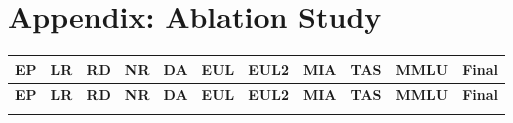 \documentclass[11pt]{article}
\begin{document}
%



\appendix
\onecolumn
\section{Appendix: Ablation Study}\nopagebreak[4]
\nopagebreak
\label{sec:appendixA}


\begin{longtable}[h]{|r|r|l|l|l|l|l|r|r|l|r|}
\hline
\multicolumn{1}{|c|}{\textbf{EP}} & \multicolumn{1}{c|}{\textbf{LR}} & \multicolumn{1}{c|}{\textbf{RD}} & \multicolumn{1}{c|}{\textbf{NR}} & \multicolumn{1}{c|}{\textbf{DA}} & \multicolumn{1}{c|}{\textbf{EUL}} & \multicolumn{1}{c|}{\textbf{EUL2}} & \multicolumn{1}{c|}{\textbf{MIA}} & \multicolumn{1}{c|}{\textbf{TAS}} & \multicolumn{1}{c|}{\textbf{MMLU}} & \multicolumn{1}{c|}{\textbf{Final}} \\ 
\hline
\endfirsthead

\hline
\multicolumn{1}{|c|}{\textbf{EP}} & \multicolumn{1}{c|}{\textbf{LR}} & \multicolumn{1}{c|}{\textbf{RD}} & \multicolumn{1}{c|}{\textbf{NR}} & \multicolumn{1}{c|}{\textbf{DA}} & \multicolumn{1}{c|}{\textbf{EUL}} & \multicolumn{1}{c|}{\textbf{EUL2}} & \multicolumn{1}{c|}{\textbf{MIA}} & \multicolumn{1}{c|}{\textbf{TAS}} & \multicolumn{1}{c|}{\textbf{MMLU}} & \multicolumn{1}{c|}{\textbf{Final}} \\
\hline
\endhead

\hline
\endfoot


\end{longtable}
\end{document}
